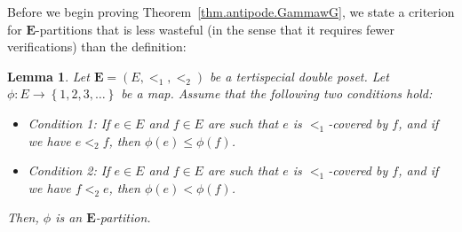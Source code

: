 \documentclass[12pt]{article}
\theoremstyle{plain}
\newtheorem{lemma}[theorem]{Lemma}
\theoremstyle{definition}
\theoremstyle{remark}
\newcommand{\EE}{{\mathbf{E}}}
\begin{document}
Before we begin proving Theorem~\ref{thm.antipode.GammawG}, we state a
criterion for $\EE$-partitions that is less wasteful (in the sense that
it requires fewer verifications) than the definition:

\begin{lemma}
\label{lem.Epartition.cover}
Let $\EE = \left(E, <_1, <_2\right)$ be a tertispecial double poset.
Let $\phi : E \to \left\{1, 2, 3, \ldots\right\}$ be a map. Assume
that the following two conditions hold:

\begin{itemize}

\item \textit{Condition 1:} If $e \in E$ and $f \in E$ are such that
$e$ is $<_1$-covered by $f$, and if we have $e <_2 f$, then
$\phi\left(e\right) \leq \phi\left(f\right)$.

\item \textit{Condition 2:} If $e \in E$ and $f \in E$ are such that
$e$ is $<_1$-covered by $f$, and if we have $f <_2 e$, then
$\phi\left(e\right) < \phi\left(f\right)$.

\end{itemize}

Then, $\phi$ is an $\EE$-partition.
\end{lemma}
\end{document}
